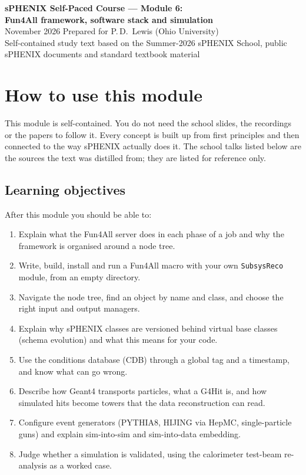 \documentclass[11pt,letterpaper]{article}
\begin{document}
\begin{center}
{\LARGE\bfseries sPHENIX Self-Paced Course --- Module 6:}\\[4pt]
{\Large\bfseries Fun4All framework, software stack and simulation}\\[8pt]
November 2026 \quad Prepared for P.\,D.\ Lewis (Ohio University)\\[2pt]
\small Self-contained study text based on the Summer-2026 sPHENIX School, public sPHENIX documents and standard textbook material
\end{center}

\tableofcontents
\newpage

\section*{How to use this module}
This module is self-contained. You do not need the school slides, the recordings or the papers to follow it.
Every concept is built up from first principles and then connected to the way sPHENIX actually does it.
The school talks listed below are the sources the text was distilled from; they are listed for reference only.

\subsection*{Learning objectives}
After this module you should be able to:
\begin{enumerate}[label=O\arabic*.]
\item Explain what the Fun4All server does in each phase of a job and why the framework is organised around a node tree.
\item Write, build, install and run a Fun4All macro with your own \texttt{SubsysReco} module, from an empty directory.
\item Navigate the node tree, find an object by name and class, and choose the right input and output managers.
\item Explain why sPHENIX classes are versioned behind virtual base classes (schema evolution) and what this means for your code.
\item Use the conditions database (CDB) through a global tag and a timestamp, and know what can go wrong.
\item Describe how Geant4 transports particles, what a G4Hit is, and how simulated hits become towers that the data reconstruction can read.
\item Configure event generators (PYTHIA8, HIJING via HepMC, single-particle guns) and explain sim-into-sim and sim-into-data embedding.
\item Judge whether a simulation is validated, using the calorimeter test-beam re-analysis as a worked case.
\end{enumerate}
\end{document}
